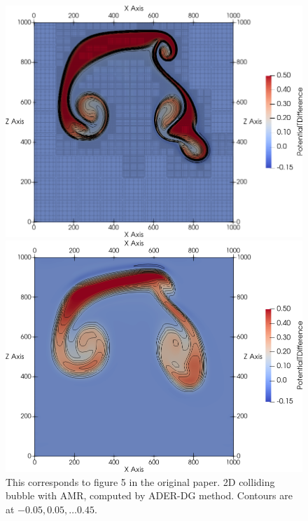 \documentclass[runningheads]{llncs}
\begin{document}
\begin{figure}[tb] 
  \centering 
    \begin{minipage}[t]{.473\textwidth} 
      \centering 
  \includegraphics[width=\textwidth]{screenshots/two_bubbles_dg.png}
  \caption{\label{fig:two-bubbles-2d-dg-amr}%
  This corresponds to figure 5 in the original paper.
  2D colliding bubble with AMR, computed by ADER-DG method.
  Contours are at $-0.05, 0.05, \ldots 0.45$.
  }

    \end{minipage}\quad%
  \begin{minipage}[t]{.473\textwidth}
    \centering
  \includegraphics[width=1\textwidth]{screenshots/two_bubbles_fv.png}

  \end{minipage}
  \end{figure}
\end{document}
